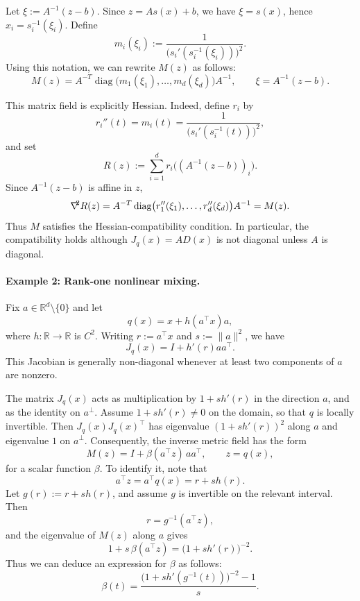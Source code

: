 \documentclass[a4paper,11pt,fullpage]{article}
\theoremstyle{plain}
\theoremstyle{definition}
\theoremstyle{plain}
\let\nablaold\nabla
\renewcommand{\nabla}{\nablaold\mkern-2.5mu}
\begin{document}
Let $\xi:=A^{-1}(z-b).$ 
Since $z=A s(x)+b$, we have $\xi=s(x)$, hence \(x_i=s_i^{-1}(\xi_i)\). Define
\[
    m_i(\xi_i):=
    \frac{1}{\bigl(s_i'(s_i^{-1}(\xi_i))\bigr)^2}.
\]
Using this notation, we can rewrite $M(z)$ as follows: 
\[
    M(z)
    =
    A^{-T}\operatorname{diag}\bigl(m_1(\xi_1),\dots,m_d(\xi_d)\bigr)A^{-1},
    \qquad
    \xi=A^{-1}(z-b).
\]

This matrix field is explicitly Hessian. Indeed, define \(r_i\) by
\[
    r_i''(t)=m_i(t)
    =
    \frac{1}{\bigl(s_i'(s_i^{-1}(t))\bigr)^2},
\]
and set
\[
    R(z):=\sum_{i=1}^d r_i\bigl((A^{-1}(z-b))_i\bigr).
\]
Since \(A^{-1}(z-b)\) is affine in \(z\),
\[
    \nabla^2 R(z)
    =
    A^{-T}\operatorname{diag}\bigl(r_1''(\xi_1),\dots,r_d''(\xi_d)\bigr)A^{-1}
    =
    M(z).
\]
Thus $M$ satisfies the Hessian-compatibility condition. 
In particular, the compatibility holds although $J_q(x)=AD(x)$ is not diagonal unless $A$ is diagonal.

\paragraph{Example 2: Rank-one nonlinear mixing.}
Fix \(a\in\mathbb R^d\setminus\{0\}\) and let
\begin{equation*}
    q(x)=x+h(a^\top x)a,
\end{equation*}
where \(h:\mathbb R\to\mathbb R\) is \(C^2\). 
Writing \(r:=a^\top x\) and \(s:=\|a\|^2\), we have
\[
    J_q(x)=I+h'(r)aa^\top.
\]
This Jacobian is generally non-diagonal whenever at least two components of \(a\) are nonzero.

The matrix \(J_q(x)\) acts as multiplication by \(1+s h'(r)\) in the direction \(a\), and as the identity on \(a^\perp\). 
Assume \(1+s h'(r)\neq 0\) on the domain, so that \(q\) is locally invertible. 
Then \(J_q(x)J_q(x)^\top\) has eigenvalue \((1+s h'(r))^2\) along \(a\) and eigenvalue \(1\) on \(a^\perp\). 
Consequently, the inverse metric field has the form
\[
    M(z)=I+\beta(a^\top z)\,aa^\top,
    \qquad z=q(x),
\]
for a scalar function \(\beta\). To identify it, note that
\[
    a^\top z
    =
    a^\top q(x)
    =
    r+s h(r).
\]
Let \(g(r):=r+s h(r)\), and assume \(g\) is invertible on the relevant interval. Then
\[
    r=g^{-1}(a^\top z),
\]
and the eigenvalue of \(M(z)\) along \(a\) gives
\[
    1+s\,\beta(a^\top z)
    =
    \bigl(1+s h'(r)\bigr)^{-2}.
\]
Thus we can deduce an expression for $\beta$ as follows: 
\[
    \beta(t)
    =
    \frac{\bigl(1+s h'(g^{-1}(t))\bigr)^{-2}-1}{s}.
\]
\end{document}
